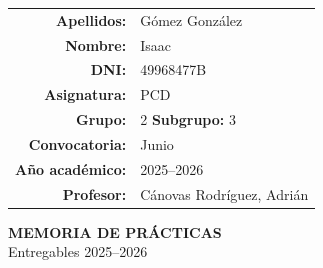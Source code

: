 \documentclass[a4paper,12pt,titlepage,oneside]{article}
\begin{document}
\singlespacing  %

\begin{titlepage}
    \thispagestyle{empty} %
    \begin{flushright}
        \begin{tabular}{rl}
            \textbf{Apellidos:} & Gómez González \\
            \textbf{Nombre:} & Isaac \\
            \textbf{DNI:} & 49968477B \\
            \textbf{Asignatura:} & PCD \\
            \textbf{Grupo:} & 2 \quad \textbf{Subgrupo:} 3 \\
            \textbf{Convocatoria:} & Junio \\
            \textbf{Año académico:} & 2025--2026 \\
            \textbf{Profesor:} & Cánovas Rodríguez, Adrián \\
        \end{tabular}
    \end{flushright}

    \vspace{4cm}

    \begin{center}
        \huge \textbf{MEMORIA DE PRÁCTICAS} \\
        \vspace{1cm}
        \Large Entregables 2025--2026
    \end{center}

    \vfill
\end{titlepage}

\tableofcontents  %
\newpage
\end{document}
